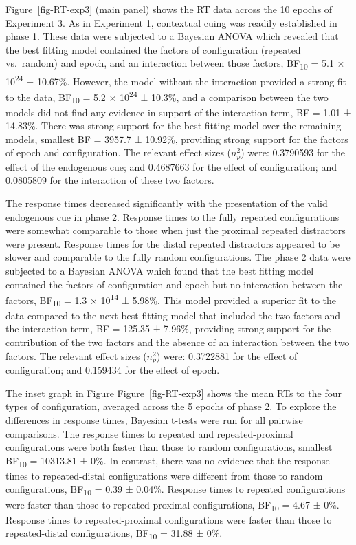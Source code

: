 \documentclass[
  man,
  floatsintext,
  longtable,
  nolmodern,
  notxfonts,
  notimes,
  colorlinks=true,linkcolor=blue,citecolor=blue,urlcolor=blue]{apa7}
\begin{document}
Figure~\ref{fig-RT-exp3} (main panel) shows the RT data across the 10
epochs of Experiment 3. As in Experiment 1, contextual cuing was readily
established in phase 1. These data were subjected to a Bayesian ANOVA
which revealed that the best fitting model contained the factors of
configuration (repeated vs.~random) and epoch, and an interaction
between those factors, BF\textsubscript{10} = 5.1 ×
10\textsuperscript{24} ± 10.67\%. However, the model without the
interaction provided a strong fit to the data, BF\textsubscript{10} =
5.2 × 10\textsuperscript{24} ± 10.3\%, and a comparison between the two
models did not find any evidence in support of the interaction term, BF
= 1.01 ± 14.83\%. There was strong support for the best fitting model
over the remaining models, smallest BF = 3957.7 ± 10.92\%, providing
strong support for the factors of epoch and configuration. The relevant
effect sizes (\(n^2_p\)) were: 0.3790593 for the effect of the
endogenous cue; and 0.4687663 for the effect of configuration; and
0.0805809 for the interaction of these two factors.

The response times decreased significantly with the presentation of the
valid endogenous cue in phase 2. Response times to the fully repeated
configurations were somewhat comparable to those when just the proximal
repeated distractors were present. Response times for the distal
repeated distractors appeared to be slower and comparable to the fully
random configurations. The phase 2 data were subjected to a Bayesian
ANOVA which found that the best fitting model contained the factors of
configuration and epoch but no interaction between the factors,
BF\textsubscript{10} = 1.3 × 10\textsuperscript{14} ± 5.98\%. This model
provided a superior fit to the data compared to the next best fitting
model that included the two factors and the interaction term, BF =
125.35 ± 7.96\%, providing strong support for the contribution of the
two factors and the absence of an interaction between the two factors.
The relevant effect sizes (\(n^2_p\)) were: 0.3722881 for the effect of
configuration; and 0.159434 for the effect of epoch.

The inset graph in Figure Figure~\ref{fig-RT-exp3} shows the mean RTs to
the four types of configuration, averaged across the 5 epochs of phase
2. To explore the differences in response times, Bayesian t-tests were
run for all pairwise comparisons. The response times to repeated and
repeated-proximal configurations were both faster than those to random
configurations, smallest BF\textsubscript{10} = 10313.81 ± 0\%. In
contrast, there was no evidence that the response times to
repeated-distal configurations were different from those to random
configurations, BF\textsubscript{10} = 0.39 ± 0.04\%. Response times to
repeated configurations were faster than those to repeated-proximal
configurations, BF\textsubscript{10} = 4.67 ± 0\%. Response times to
repeated-proximal configurations were faster than those to
repeated-distal configurations, BF\textsubscript{10} = 31.88 ± 0\%.
\end{document}

